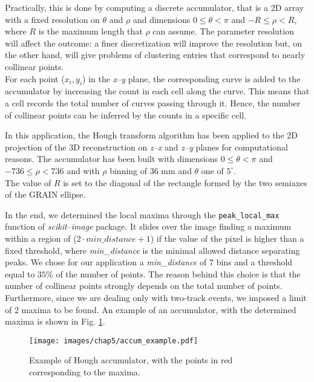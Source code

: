 Practically, this is done by computing a discrete accumulator, that is a 2D array with a fixed resolution on $\theta$ and $\rho$ and dimensions $0 \leq \theta < \pi$ and $-R \leq \rho < R$, where $R$ is the maximum length that $\rho$ can assume. The parameter resolution will affect the outcome: a finer discretization will improve the resolution but, on the other hand, will give problems of clustering entries that correspond to nearly collinear points. \\ For each point ($x_i, y_i$) in the \textit{x--y} plane, the corresponding curve is added to the accumulator by increasing the count in each cell along the curve. This means that a cell records the total number of curves passing through it. Hence, the number of collinear points can be inferred by the counts in a specific cell. 

In this application, the Hough transform algorithm has been applied to the 2D projection of the 3D reconstruction on \textit{z--x} and \textit{z--y} planes for computational reasons. The accumulator has been built with dimensions $0 \leq \theta < \pi$ and $-736 \leq \rho < 736$ and with $\rho$ binning of 36 mm and $\theta$ one of $5^\circ$.\\ The value of $R$ is set to the diagonal of the rectangle formed by the two semiaxes of the GRAIN ellipse.

In the end, we determined the local maxima through the \texttt{peak\_local\_max} function of \textit{scikit--image} package. It slides over the image finding a maximum within a region of ($2 \cdot min\_distance + 1$) if the value of the pixel is higher than a fixed threshold, where \textit{min\_distance} is the minimal allowed distance separating peaks. We chose for our application a \textit{min\_distance} of 7 bins and a threshold equal to $35\%$ of the number of \lpc points. The reason behind this choice is that the number of collinear points strongly depends on the total number of \lpc points. Furthermore, since we are dealing only with two-track events, we imposed a limit of 2 maxima to be found. An example of an accumulator, with the determined maxima is shown in Fig. \ref{fig:accumulator}.

\begin{figure}[h!]
    \centering
    \texttt{[image: images/chap5/accum\_example.pdf]}
    \caption{Example of Hough accumulator, with the points in red corresponding to the maxima.}
    \label{fig:accumulator}
\end{figure}

